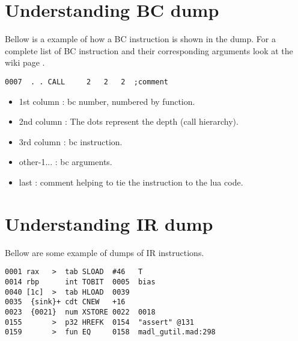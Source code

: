 \section{Understanding BC dump}
\label{Sec:dump-bc}
Bellow is a example of how a BC instruction is shown in the dump. For a complete
list of BC instruction and their corresponding arguments look at the wiki page
\cite{luajit-bc}.
\begin{verbatim}
0007  . . CALL     2   2   2  ;comment
\end{verbatim}
\begin{itemize}
  \item 1st column : bc number, numbered by function.
  \item 2nd column : The dots represent the depth (call hierarchy).
  \item 3rd column : bc instruction.
  \item other-1... : bc arguments.
  \item last       : comment helping to tie the instruction to the lua code.
\end{itemize}

\section{Understanding IR dump}
Bellow are some example of dumps of IR instructions.
\label{Sec:dump-ir}
\begin{verbatim}
0001 rax   >  tab SLOAD  #46   T
0014 rbp      int TOBIT  0005  bias
0040 [1c]  >  tab HLOAD  0039
0035  {sink}+ cdt CNEW   +16
0023  {0021}  num XSTORE 0022  0018
0155       >  p32 HREFK  0154  "assert" @131
0159       >  fun EQ     0158  madl_gutil.mad:298
\end{verbatim}

